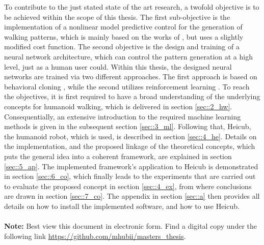 To contribute to the just stated state of the art research, a twofold objective is to be achieved within the scope of this thesis. The first sub-objective is the implementation of a nonlinear model predictive control for the generation of walking patterns, which is mainly based on the works of \cite{naveau2016reactive}, but uses a slightly modified cost function. The second objective is the design and training of a neural network architecture, which can control the pattern generation at a high level, just as a human user could. Within this thesis, the designed neural networks are trained via two different approaches. The first approach is based on behavioral cloning \cite{bojarski2016end}, while the second utilizes reinforcement learning \cite{schulman2017proximal}. To reach the objectives, it is first required to have a broad understanding of the underlying concepts for humanoid walking, which is delivered in section \ref{sec::2_hw}. Consequentially, an extensive introduction to the required machine learning methods is given in the subsequent section \ref{sec::3_ml}. Following that, Heicub, the humanoid robot, which is used, is described in section \ref{sec::4_he}. Details on the implementation, and the proposed linkage of the theoretical concepts, which puts the general idea into a coherent framework, are explained in section \ref{sec::5_ap}. The implemented framework's application to Heicub is demonstrated in section \ref{sec::6_co}, which finally leads to the experiments that are carried out to evaluate the proposed concept in section \ref{sec::4_ex}, from where conclusions are drawn in section \ref{sec::7_co}. The appendix in section \ref{sec::a} then provides all details on how to install the implemented software, and how to use Heicub.
\\\\
\textbf{Note:} Best view this document in electronic form. Find a digital copy under the following link \href{https://github.com/mhubii/masters_thesis}{\underline{https://github.com/mhubii/masters\_thesis}}.

